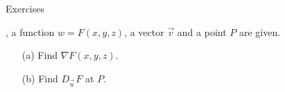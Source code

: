 {\noindent Exercises}
{, a function $w=F(x,y,z)$, a vector $\vec v$ and a point $P$ are given. 
\begin{enumerate}
	\item [(a)] Find $\nabla F(x,y,z)$.
	\item [(b)] Find $D_{\vec u\,}F$ at $P$.
\end{enumerate}
}
